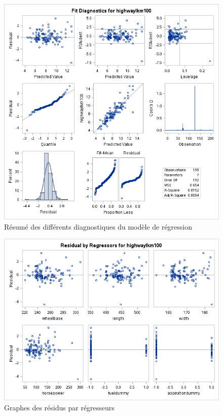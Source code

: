 \documentclass[11pt,a4paper]{article}
\begin{document}
\begin{figure}
	\centering
	\includegraphics[width=1\linewidth]{fitdiagnostics}
	\caption{Résumé des différents diagnostiques du modèle de régression}
	\label{fig:diagnostics}
\end{figure}
\begin{figure}
	\centering
	\includegraphics[width=1\linewidth]{resbyregressors}
	\caption{Graphes des résidus par régresseurs}
	\label{fig:regressors}
\end{figure}
\end{document}
